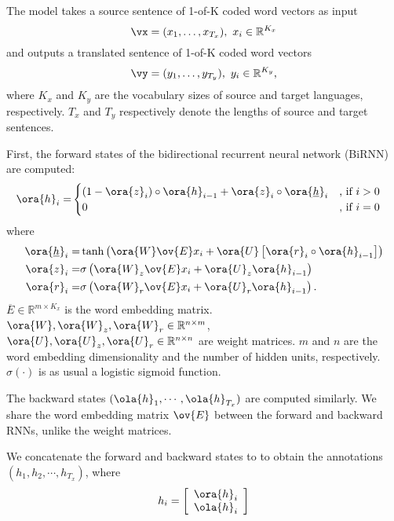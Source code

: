 The model takes a source sentence of 1-of-K coded word vectors as input
\[
    \vx = (x_1, \ldots, x_{T_x}),\mbox{ }x_i \in \mathbb{R}^{K_x}
\]
and outputs a translated sentence of 1-of-K coded word vectors
\[
    \vy = (y_1, \ldots, y_{T_y}),\mbox{ }y_i \in \mathbb{R}^{K_y},
\]
where $K_x$ and $K_y$ are the vocabulary sizes of source and target languages,
respectively. $T_x$ and $T_y$ respectively denote the lengths of source and
target sentences.

First, the forward states of the bidirectional recurrent neural network (BiRNN)
are computed:
\begin{align*}
    \ora{h}_i =& 
    \begin{cases}
        (1 - \ora{z}_i) \circ \ora{h}_{i-1}  + \ora{z}_i \circ \ora{\underline{h}}_{i} &\mbox{, if }i > 0 \\
        0 &\mbox{, if }i = 0
    \end{cases}
\end{align*}
where
\begin{align*}
    \ora{\underline{h}}_i =& \tanh \left( \ora{W} \ov{E} x_i + \ora{U}\left[ \ora{r}_i \circ \ora{h}_{i-1} \right] \right) \\
    \ora{z}_i =& \sigma\left( \ora{W}_z \ov{E} x_i + \ora{U}_z \ora{h}_{i-1} \right) \\
    \ora{r}_i =& \sigma\left( \ora{W}_r \ov{E} x_i + \ora{U}_r \ora{h}_{i-1} \right).
\end{align*}
$\overline{E} \in \mathbb{R}^{m\times K_x}$ is the word embedding matrix.
$\ora{W}, \ora{W}_z, \ora{W}_r \in \mathbb{R}^{n\times m}$, $\ora{U}, \ora{U}_z,
\ora{U}_r \in \mathbb{R}^{n\times n}$ are weight matrices. $m$ and $n$ are the word
embedding dimensionality and the number of hidden units, respectively. 
$\sigma(\cdot)$ is as usual a logistic sigmoid function.

The backward states $(\ola{h}_1, \cdots, \ola{h}_{T_x})$ are computed similarly.
We share the word embedding matrix $\ov{E}$ between the forward and backward
RNNs, unlike the weight matrices.

We concatenate the forward and backward states to to obtain the annotations
$(h_1, h_2, \cdots, h_{T_x})$, where
\begin{align}
    \label{eq:annotation}
    h_i = \left[ 
        \begin{array}{c}
    \ora{h}_i \\
    \ola{h}_i 
\end{array}
\right]
    \end{align}

